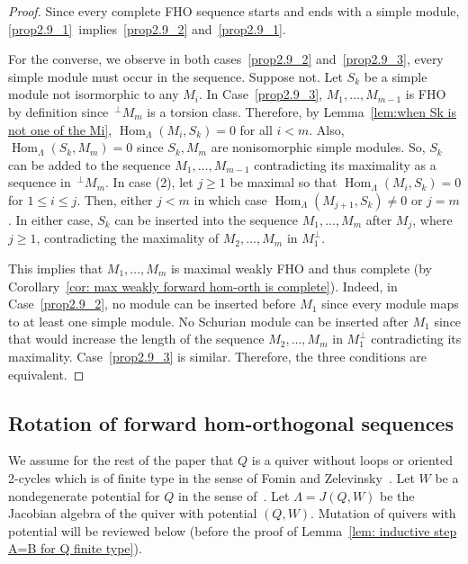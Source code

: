 \documentclass[ALCO,ThmDefs,Unicode,epreuves]{cedram}
\DeclareMathOperator{\Hom}{Hom}%
\begin{document}
\begin{proof} Since every complete FHO sequence starts and ends with a simple module, \ref{prop2.9_1}~implies~\ref{prop2.9_2} and~\ref{prop2.9_1}.

For the converse, we observe in both cases~\ref{prop2.9_2} and~\ref{prop2.9_3}, every simple module must occur in the sequence. Suppose not. Let $S_k$ be a simple module not isormorphic to any $M_i$. In Case~\ref{prop2.9_3}, $M_1,\ldots,M_{m-1}$ is FHO by definition since $\,^\perp M_m$ is a torsion class. Therefore, by Lemma~\ref{lem:when Sk is not one of the Mi}, $\Hom_\Lambda(M_i,S_k)=0$ for all $i<m$. Also, $\Hom_\Lambda(S_k,M_m)=0$ since $S_k,M_m$ are nonisomorphic simple modules. So, $S_k$ can be added to the sequence $M_1,\ldots,M_{m-1}$ contradicting its maximality as a sequence in $\,^\perp M_m$. In case (2), let $j\ge1$ be maximal so that $\Hom_\Lambda(M_i,S_k)=0$ for $1\le i\le j$. Then, either $j<m$ in which case $\Hom_\Lambda(M_{j+1},S_k)\neq0$ or $j=m$. In either case, $S_k$ can be inserted into the sequence $M_1,\ldots,M_m$ after $M_j$, where $j\ge1$, contradicting the maximality of $M_2,\ldots,M_m$ in $M_1^\perp$. 

This implies that $M_1,\ldots,M_m$ is maximal weakly FHO and thus complete (by Corollary~\ref{cor: max weakly forward hom-orth is complete}). Indeed, in Case~\ref{prop2.9_2}, no module can be inserted before $M_1$ since every module maps to at least one simple module. No Schurian module can be inserted after $M_1$ since that would increase the length of the sequence $M_2,\ldots,M_m$ in $M_1^\perp$ contradicting its maximality. Case~\ref{prop2.9_3} is similar. Therefore, the three conditions are equivalent.
\end{proof}


\subsection{Rotation of forward hom-orthogonal sequences} 


We assume for the rest of the paper that $Q$ is a quiver without loops or oriented 2-cycles which is of finite type in the sense of Fomin and Zelevinsky~\cite{FZ4}. Let $W$ be a nondegenerate potential for $Q$ in the sense of~\cite{DWZ1}. Let $\Lambda=J(Q,W)$ be the Jacobian algebra of the quiver with potential $(Q,W)$. Mutation of quivers with potential will be reviewed below (before the proof of Lemma~\ref{lem: inductive step A=B for Q finite type}).
\end{document}
